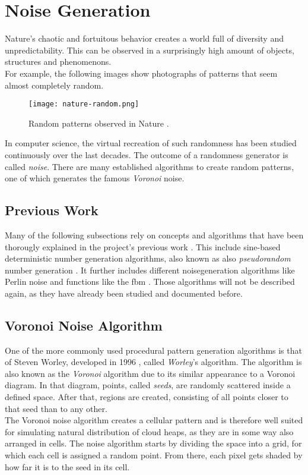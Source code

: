 \section{Noise Generation}
\label{section:noise}
Nature's chaotic and fortuitous behavior creates a world full of diversity and unpredictability.
This can be observed in a surprisingly high amount of objects, structures and phenomenons.
\\
For example, the following images show photographs of patterns that seem almost completely random.

\begin{figure}[H]
    \texttt{[image: nature-random.png]}
    \caption{Random patterns observed in Nature \protect\cite{bookofshaders:noise}.}
    \label{img:rnd:natural}
\end{figure}

\noindent
In computer science, the virtual recreation of such randomness has been studied continuously over the last decades.
The outcome of a randomness generator is called \emph{\gls{noise}}.
There are many established algorithms to create random patterns, one of which generates the famous \emph{Voronoi} \gls{noise}.

\subsection{Previous Work}
Many of the following subsections rely on concepts and algorithms that have been thorougly explained in the project's previous work \cite{project2:noise}.
This include sine-based deterministic number generation algorithms, also known as also \emph{\gls{pseudorandom}} number generation \cite{project2:noise:pseudo}.
It further includes different \gls{noisegeneration} algorithms like Perlin \gls{noise} \cite{project2:noise:perlin} and functions like the \gls{fbm} \cite{project2:noise:fbm}.
\emptyline
Those algorithms will not be described again, as they have already been studied and documented before.

\pagebreak

\subsection{Voronoi Noise Algorithm}
\label{section:noise:voronoi}
One of the more commonly used procedural pattern generation algorithms is that of Steven Worley, developed in 1996 \cite{worley}, called \emph{Worley}'s algorithm.
The algorithm is also known as the \emph{Voronoi} algorithm due to its similar appearance to a Voronoi diagram.
In that diagram, points, called \emph{seeds}, are randomly scattered inside a defined space.
After that, regions are created, consisting of all points closer to that seed than to any other.
\\
The Voronoi \gls{noise} algorithm creates a cellular pattern and is therefore well suited for simulating natural distribution of cloud heaps, as they are in some way also arranged in cells.
\emptyline
The \gls{noise} algorithm starts by dividing the space into a grid, for which each cell is assigned a random point.
From there, each pixel gets shaded by how far it is to the seed in its cell.

